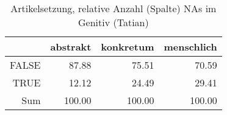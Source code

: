 \begin{table}[ht]
\centering
\begin{tabular}{rrrr}
  \hline
 & abstrakt & konkretum & menschlich \\ 
  \hline
FALSE & 87.88 & 75.51 & 70.59 \\ 
  TRUE & 12.12 & 24.49 & 29.41 \\ 
  Sum & 100.00 & 100.00 & 100.00 \\ 
   \hline
\end{tabular}
\caption{Artikelsetzung, relative Anzahl (Spalte) NAs im Genitiv (Tatian)} 
\end{table}
